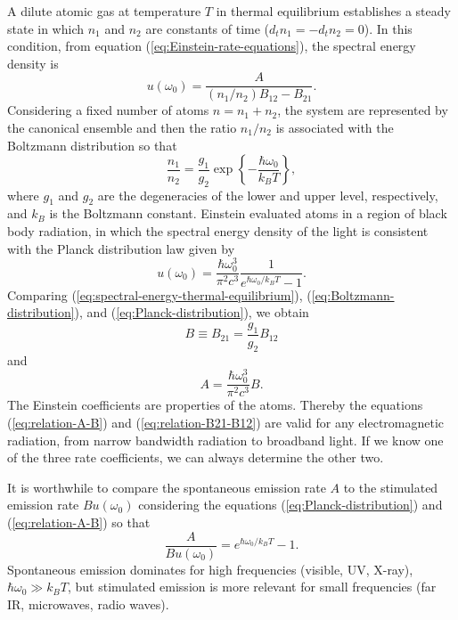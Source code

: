 A dilute atomic gas at temperature $ T $ in thermal equilibrium establishes a steady state in which $ n_1 $ and $ n_2 $ are constants of time ($ d_{t} n_1 = - d_{t} n_2 = 0 $). In this condition, from equation (\ref{eq:Einstein-rate-equations}), the spectral energy density is
\begin{equation}
	u({\omega_0}) = \frac{A}{(n_1 / n_2) B_{12} - B_{21}}.
	\label{eq:spectral-energy-thermal-equilibrium}
\end{equation}
Considering a fixed number of atoms $ n = n_1 + n_2 $, the system are represented by the canonical ensemble and then the ratio $ n_1 / n_2 $ is associated with the Boltzmann distribution so that
\begin{equation}
	\frac{n_1}{n_2} = \frac{g_1}{g_2} \exp\left\{-\frac{\hbar \omega_0}{k_B T}\right\},
	\label{eq:Boltzmann-distribution}
\end{equation}
where $ g_1 $ and $ g_2 $ are the degeneracies of the lower and upper level, respectively, and $ k_B $ is the Boltzmann constant. Einstein evaluated atoms in a region of black body radiation,  in which the spectral energy density of the light is consistent with the Planck distribution law given by
\begin{equation}
	u(\omega_0) = \frac{\hbar \omega_0^3}{\pi^2 c^3} \frac{1}{e^{\hbar \omega_0 / k_B T} - 1}.
	\label{eq:Planck-distribution}
\end{equation}
Comparing (\ref{eq:spectral-energy-thermal-equilibrium}), (\ref{eq:Boltzmann-distribution}), and (\ref{eq:Planck-distribution}), we obtain
\begin{equation} 
	B \equiv B_{21} = \frac{g_1}{g_2} B_{12}
	\label{eq:relation-B21-B12}
\end{equation}
and
\begin{equation} 
	A = \frac{\hbar \omega_0^3}{\pi^2 c^3} B.
	\label{eq:relation-A-B}
\end{equation}
The Einstein coefficients are properties of the atoms. Thereby the equations (\ref{eq:relation-A-B}) and (\ref{eq:relation-B21-B12}) are valid for any electromagnetic radiation, from narrow bandwidth radiation to broadband light. If we know one of the three rate coefficients, we can always determine the other two.

It is worthwhile to compare the spontaneous emission rate $ A $ to the stimulated emission rate $ B u(\omega_0) $ considering the equations (\ref{eq:Planck-distribution}) and (\ref{eq:relation-A-B}) so that
\begin{equation} 
	\frac{A}{B u(\omega_0)} = e^{\hbar \omega_0 / k_B T} - 1.
\end{equation}
Spontaneous emission dominates for high frequencies (visible, UV, X-ray), $ \hbar \omega_0 \gg k_B T $, but stimulated emission is more relevant for small frequencies (far IR, microwaves, radio waves).

